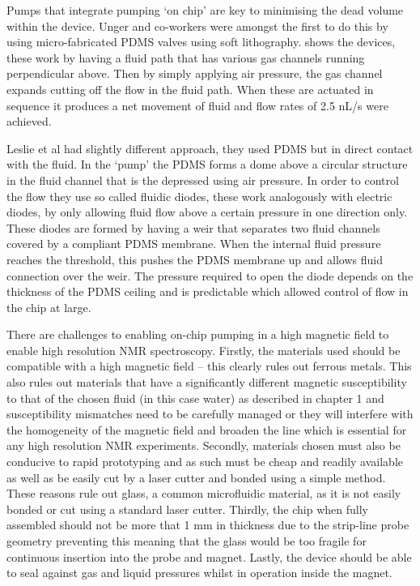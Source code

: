 Pumps that integrate pumping ‘on chip’ are key to minimising the dead volume within the device.
Unger and co-workers\citep{RN59} were amongst the first to do this by using micro-fabricated PDMS valves
using soft lithography.  shows the devices, these work by having a fluid path that has various gas
channels running perpendicular above. Then by simply applying air pressure, the gas channel expands cutting off
the flow in the fluid path. When these are actuated in sequence it produces a net movement
of fluid and flow rates of 2.5 nL/s were achieved.

Leslie et al\citep{RN100} had slightly different
approach, they used PDMS but in direct contact with the fluid. In the ‘pump’ the PDMS forms
a dome above a circular structure in the fluid channel that is the depressed using air
pressure. In order to control the flow they use so called fluidic diodes, these work
analogously with electric diodes, by only allowing fluid flow above a certain pressure in
one direction only. These diodes are formed by having a weir that separates two fluid
channels covered by a compliant PDMS membrane. When the internal fluid pressure reaches the
threshold, this pushes the PDMS membrane up and allows fluid connection over the weir. The
pressure required to open the diode depends on the thickness of the PDMS ceiling and is
predictable which allowed control of flow in the chip at large.

There are challenges to enabling on-chip pumping in a high magnetic field to enable high
resolution NMR spectroscopy. Firstly, the materials used should be compatible with a high
magnetic field – this clearly rules out ferrous metals. This also rules out materials that
have a significantly different magnetic susceptibility to that of the chosen fluid (in this
case water) as described in chapter 1 and susceptibility mismatches need to be carefully
managed or they will interfere with the homogeneity of the magnetic field and broaden the line which is
essential for any high resolution NMR experiments. Secondly, materials chosen must also be
conducive to rapid prototyping and as such must be cheap and readily available as well as
be easily cut by a laser cutter and bonded using a simple method. These reasons rule out
glass, a common microfluidic material, as it is not easily bonded or cut using a standard
laser cutter. Thirdly, the chip when fully assembled should not be more
that 1 mm in thickness due to the strip-line probe geometry preventing this meaning that
the glass would be too fragile for continuous insertion into the probe and magnet. Lastly,
the device should be able to seal against gas and liquid pressures whilst in operation
inside the magnet.

